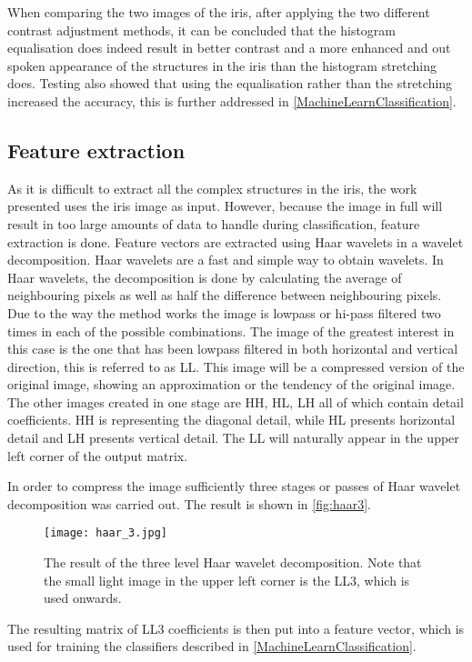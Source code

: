 When comparing the two images of the iris, after applying the two different contrast adjustment methods, it can be concluded that the histogram equalisation does indeed result in better contrast and a more enhanced and out spoken appearance of the structures in the iris than the histogram stretching does. Testing also showed that using the equalisation rather than the stretching increased the accuracy, this is further addressed in \autoref{MachineLearnClassification}. 

\subsection{Feature extraction}
As it is difficult to extract all the complex structures in the iris, the work presented uses the iris image as input. However, because the image in full will result in too large amounts of data to handle during classification, feature extraction is done. Feature vectors are extracted using Haar wavelets in a wavelet decomposition. 
Haar wavelets are a fast and simple way to obtain wavelets. In Haar wavelets, the decomposition is done by calculating the average of neighbouring pixels as well as half the difference between neighbouring pixels. Due to the way the method works the image is lowpass or hi-pass filtered two times in each of the possible combinations. The image of the greatest interest in this case is the one that has been lowpass filtered in both horizontal and vertical direction, this is referred to as LL. This image will be a compressed version of the original image, showing an approximation or the tendency of the original image. The other images created in one stage are HH, HL, LH all of which contain detail coefficients. HH is representing the diagonal detail, while HL presents horizontal detail and LH presents vertical detail. The LL will naturally appear in the upper left corner of the output matrix. 

In order to compress the image sufficiently three stages or passes of Haar wavelet decomposition was carried out. The result is shown in \autoref{fig:haar3}. 

\begin{figure}[H]
\centering
\texttt{[image: haar\_3.jpg]}
\caption{The result of the three level Haar wavelet decomposition. Note that the small light image in the upper left corner is the LL3, which is used onwards.}
\label{fig:haar3}
\end{figure}
The resulting matrix of LL3 coefficients is then put into a feature vector, which is used for training the classifiers described in \autoref{MachineLearnClassification}.
